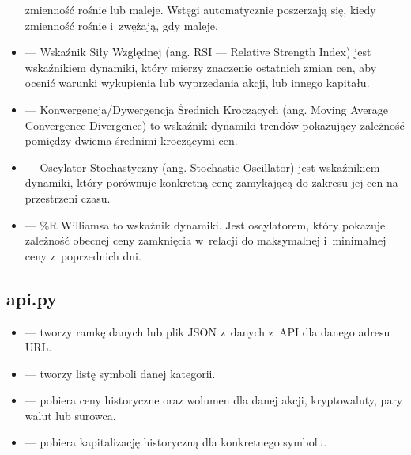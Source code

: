 \documentclass[12pt]{article}
\begin{document}
\begin{itemize}
        zmienność rośnie lub maleje.
        Wstęgi automatycznie poszerzają się, kiedy zmienność rośnie i~zwężają, gdy maleje.
        \item {} — Wskaźnik Siły Względnej (ang. RSI — Relative Strength Index) jest wskaźnikiem
        dynamiki, który mierzy znaczenie ostatnich zmian cen, aby ocenić warunki wykupienia lub wyprzedania
        akcji, lub innego kapitału.
        \item {} — Konwergencja/Dywergencja Średnich Kroczących (ang. Moving Average Convergence Divergence)
        to wskaźnik dynamiki trendów pokazujący zależność pomiędzy dwiema średnimi kroczącymi cen.
        \item {} — Oscylator Stochastyczny (ang. Stochastic Oscillator) jest wskaźnikiem dynamiki,
        który porównuje konkretną cenę zamykającą do zakresu jej cen na przestrzeni czasu.
        \item {} — \%R Williamsa to wskaźnik dynamiki.
		Jest oscylatorem, który pokazuje zależność obecnej
        ceny zamknięcia w~relacji do maksymalnej i~minimalnej ceny z~poprzednich dni.
    \end{itemize}

    \subsection{api.py}\label{subsec:api.py}
	\begin{itemize}
        \item {} — tworzy ramkę danych lub plik JSON z~danych z~API dla danego adresu URL\@.
        \item {} — tworzy listę symboli danej kategorii.
        \item {} — pobiera ceny historyczne oraz wolumen dla danej akcji, kryptowaluty,
		pary walut lub surowca.
        \item {} — pobiera kapitalizację historyczną dla konkretnego symbolu.
    \end{itemize}

    \newpage
\end{document}

